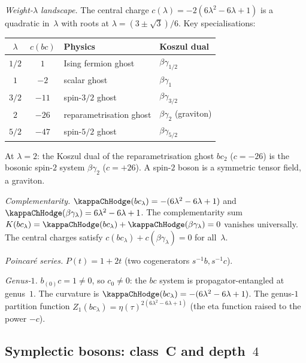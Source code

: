\begin{computation}
\smallskip
\noindent
\emph{Weight-$\lambda$ landscape.}
The central charge
$c(\lambda) = -2(6\lambda^2 - 6\lambda + 1)$ is a quadratic
in~$\lambda$ with roots at $\lambda = (3 \pm \sqrt{3})/6$.
Key specialisations:
\begin{center}
\small
\renewcommand{\arraystretch}{1.3}
\begin{tabular}{ccll}
\toprule
$\lambda$ & $c(bc)$ & \textbf{Physics} & \textbf{Koszul dual} \\
\midrule
$1/2$ & $1$ & Ising fermion ghost & $\beta\gamma_{1/2}$ \\
$1$ & $-2$ & scalar ghost & $\beta\gamma_1$ \\
$3/2$ & $-11$ & spin-$3/2$ ghost & $\beta\gamma_{3/2}$ \\
$2$ & $-26$ & reparametrisation ghost & $\beta\gamma_2$ (graviton) \\
$5/2$ & $-47$ & spin-$5/2$ ghost & $\beta\gamma_{5/2}$ \\
\bottomrule
\end{tabular}
\end{center}
At $\lambda = 2$: the Koszul dual of the reparametrisation
ghost $bc_2$ ($c = -26$) is the bosonic spin-$2$ system
$\beta\gamma_2$ ($c = +26$). A spin-$2$ boson is a
symmetric tensor field, a graviton.

\smallskip
\noindent
\emph{Complementarity.}
$\kappaChHodge(bc_\lambda) = -(6\lambda^2 - 6\lambda + 1)$ and
$\kappaChHodge(\beta\gamma_\lambda) = 6\lambda^2 - 6\lambda + 1$.
The complementarity sum
$K(bc_\lambda) = \kappaChHodge(bc_\lambda) + \kappaChHodge(\beta\gamma_\lambda) = 0$
vanishes universally. The central charges satisfy
$c(bc_\lambda) + c(\beta\gamma_\lambda) = 0$ for all~$\lambda$.

\smallskip
\noindent
\emph{Poincar\'{e} series.}
$P(t) = 1 + 2t$ (two cogenerators $s^{-1}b, s^{-1}c$).

\smallskip
\noindent
\emph{Genus-$1$.}
$b_{(0)}c = 1 \ne 0$, so $c_0 \ne 0$: the $bc$ system is
propagator-entangled at genus~$1$. The curvature is
$\kappaChHodge(bc_\lambda) = -(6\lambda^2 - 6\lambda + 1)$. The genus-$1$ partition function
$Z_1(bc_\lambda) = \eta(\tau)^{2(6\lambda^2-6\lambda+1)}$
(the eta function raised to the power $-c$).
\end{computation}

\subsection{Symplectic bosons: class~C and depth~$4$}%
\label{subsec:symplectic-boson-ordered-bar}%
%

